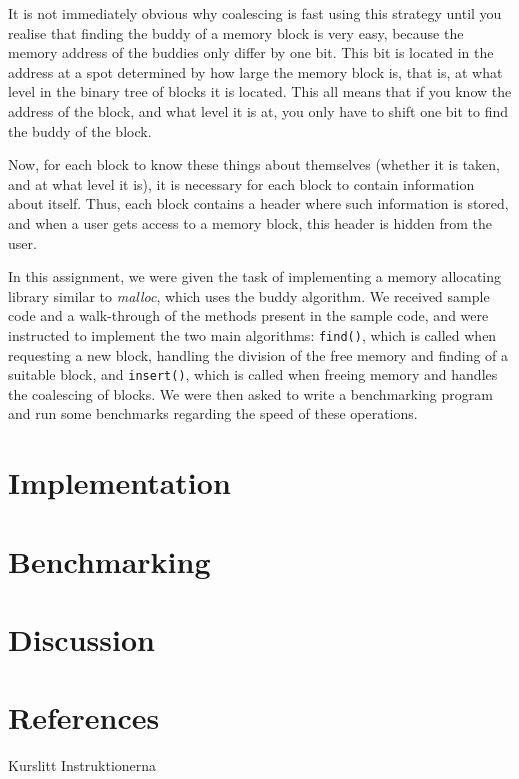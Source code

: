 \documentclass{article}
\def\code#1{\texttt{#1}}
\begin{document}
It is not immediately obvious why coalescing is fast using this strategy until you realise that finding the buddy of a memory block is very easy, because the memory address of the buddies only differ by one bit. This bit is located in the address at a spot determined by how large the memory block is, that is, at what level in the binary tree of blocks it is located. This all means that if you know the address of the block, and what level it is at, you only have to shift one bit to find the buddy of the block.

Now, for each block to know these things about themselves (whether it is taken, and at what level it is), it is necessary for each block to contain information about itself. Thus, each block contains a header where such information is stored, and when a user gets access to a memory block, this header is hidden from the user.

In this assignment, we were given the task of implementing a memory allocating library similar to \textit{malloc}, which uses the buddy algorithm. We received sample code and a walk-through of the methods present in the sample code, and were instructed to implement the two main algorithms: \code{find()}, which is called when requesting a new block, handling the division of the free memory and finding of a suitable block, and \code{insert()}, which is called when freeing memory and handles the coalescing of blocks. We were then asked to write a benchmarking program and run some benchmarks regarding the speed of these operations.

\section{Implementation}

\section{Benchmarking}

\section{Discussion}

\section{References}

Kurslitt
Instruktionerna
\end{document}
